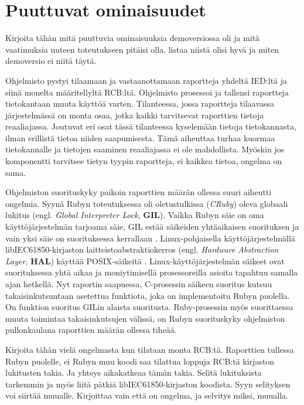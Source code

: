 \section{Puuttuvat ominaisuudet}
\begin{it}
	Kirjoita tähän mitä puuttuvia ominaisuuksia demoversiossa oli ja mitä vaatimuksia uuteen toteutukseen pitäisi olla. listaa niistä olisi hyvä ja miten demoversio ei niitä täytä.
	
\end{it}
Ohjelmisto pystyi tilaamaan ja vastaanottamaan raportteja yhdeltä IED:ltä ja siinä monelta määritellyltä RCB:ltä. Ohjelmisto prosessoi ja tallensi raportteja tietokantaan muuta käyttöä varten. Tilanteessa, jossa raportteja tilaavassa järjestelmässä on monta osaa, jotka kaikki tarvitsevat raporttien tietoja reaaliajassa. Joutuvat eri osat tässä tilanteessa kyselemään tietoja tietokannasta, ilman erillistä tietoa niiden saapumisesta. Tämä aiheuttaa turhaa kuormaa tietokannalle ja tietojen saaminen reaaliajassa ei ole mahdollista. Myöskin jos komponentti tarvitsee tietyn tyypin raportteja, ei kaikkea tietoa, ongelma on sama.

Ohjelmiston suorituskyky paikoin raporttien määrän ollessa suuri aiheutti ongelmia. Syynä Rubyn toteutuksessa oli oletustulkissa (\emph{CRuby}) oleva globaali lukitus (engl. \emph{Global Interpreter Lock}, \textbf{GIL}). Vaikka Rubyn säie on oma käyttöjärjestelmän tarjoama säie, GIL estää säikeiden yhtäaikaisen suorituksen ja vain yksi säie on suorituksessa kerrallaan \mbox{\cite[s.~131--133]{Odaira2014}}. Linux-pohjaisella käyttöjärjestelmällä libIEC61850-kirjaston laitteistoabstraktiokerros (engl. \emph{Hardware Abstraction Layer}, \textbf{HAL}) käyttää POSIX-säikeitä \cite{libIEC61850-repo}. Linux-käyttöjärjestelmän säikeet ovat suorituksessa yhtä aikaa ja moniytimisellä prosessoreilla asioita tapahtuu samalla ajan hetkellä. Nyt raportin saapuessa, C-prosessin säikeen suoritus kutsuu takaisinkutsuntaan asetettua funktiota, joka on implementoitu Rubyn puolella. On funktion suoritus GILin alaista suoritusta. Ruby-prosessin myös suorittaessa muuta toimintaa takaisinkutsujen välissä, on Rubyn suorituskyky ohjelmiston pullonkaulana raporttien määrän ollessa tiheää.

\begin{it}
	Kirjoita tähän vielä ongelmasta kun tilataan monta RCB:tä. Raporttien tullessa Rubyn puolelle, ei Rubyn muu koodi saa tilattua loppuja RCB:tä kirjaston lukitusten takia. Ja yhteys aikakatkeaa tämän takia. Selitä lukituksista tarkemmin ja myös liitä pätkiä libIEC61850-kirjaston koodista. Syyn selityksen voi siirtää muualle. Kirjoittaa vain että on ongelma, ja selvitys miksi, muualla.
\end{it}


